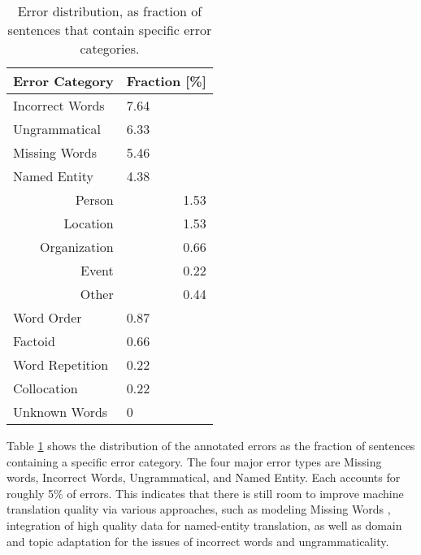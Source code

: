 \documentclass[a4paper]{article}
\begin{document}
\begin{CJK*}{UTF8}{gbsn}
\begin{table}[htb]
\centering
\begin{tabular}{@{}p{4cm}l@{}}
\toprule
\textbf{Error Category}            & \textbf{Fraction [\%]}    \\
\midrule
Incorrect Words                    & 7.64                      \\
Ungrammatical                      & 6.33                      \\
Missing Words                      & 5.46                      \\
Named Entity                       & 4.38                      \\ 
\multicolumn{1}{r}{Person\hspace*{2em}}         & \multicolumn{1}{r}{1.53}  \\
\multicolumn{1}{r}{Location\hspace*{2em}}       & \multicolumn{1}{r}{1.53}  \\
\multicolumn{1}{r}{Organization\hspace*{2em}}   & \multicolumn{1}{r}{0.66}  \\
\multicolumn{1}{r}{Event\hspace*{2em}}          & \multicolumn{1}{r}{0.22}  \\
\multicolumn{1}{r}{Other\hspace*{2em}}          & \multicolumn{1}{r}{0.44}  \\
Word Order                         & 0.87                      \\
Factoid                            & 0.66                      \\
Word Repetition                    & 0.22                      \\
Collocation                        & 0.22                      \\
Unknown Words                      & 0                         \\
\bottomrule
\end{tabular}
\caption{Error distribution, as fraction of sentences that contain specific error categories.}
\label{my-ana}
\end{table}

Table \ref{my-ana} shows the distribution of the annotated errors as the fraction of sentences containing a specific error category. The four major error types are Missing words, Incorrect Words, Ungrammatical, and Named Entity. Each accounts for roughly 5\% of errors. This indicates that there is still room to improve machine translation quality via various approaches, such as modeling Missing Words \cite{tu2016modeling,AttentionFertility}, integration of high quality data for named-entity translation, as well as domain and topic adaptation for the issues of incorrect words and ungrammaticality.
 

\end{CJK*}
\end{document}
